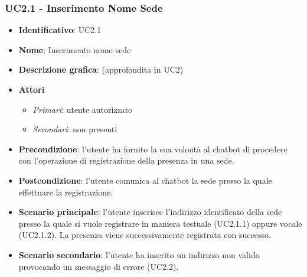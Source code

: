 \subsubsection{UC2.1 - Inserimento Nome Sede}
\begin{itemize}
    \item \textbf{Identificativo}: UC2.1
    \item \textbf{Nome}: Inserimento nome sede
    \item \textbf{Descrizione grafica}: (approfondita in UC2)
    \item \textbf{Attori}
 \begin{itemize} 
    \item \textit{Primari}: utente autorizzato
    \item \textit{Secondari}: non presenti
 \end{itemize}
 \item \textbf{Precondizione}: l'utente ha fornito la sua volontà al chatbot di procedere con l'operazione di registrazione della presenza in una sede.
 \item \textbf{Postcondizione}: l'utente comunica al chatbot la sede presso la quale effettuare la registrazione.
 \item \textbf{Scenario principale}: l'utente inserisce l'indirizzo identificato della sede presso la quale si vuole registrare in maniera testuale (UC2.1.1) oppure vocale (UC2.1.2). La presenza viene successivamente registrata con successo. 
 \item \textbf{Scenario secondario}: l'utente ha inserito un indirizzo non valido provocando un messaggio di errore (UC2.2). 
\end{itemize}

